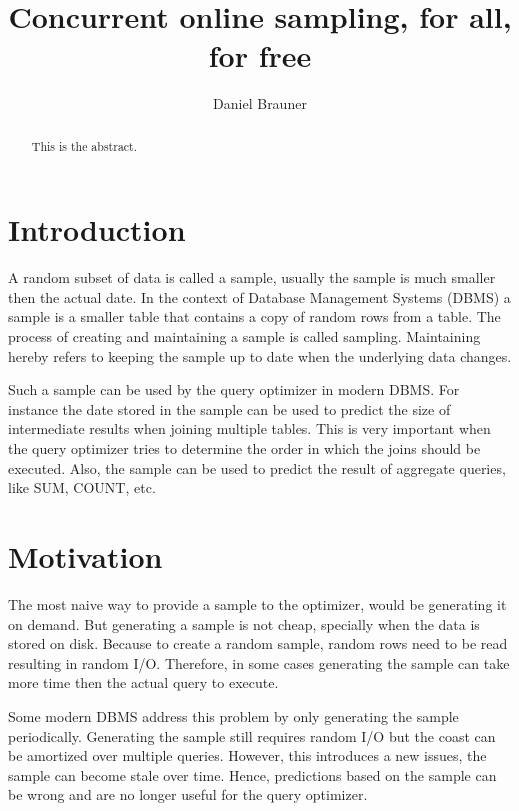 \documentclass[acmlarge,nonacm]{acmart}
\begin{document}
    \title{Concurrent online sampling, for all, for free}

    \author{Daniel Brauner}
    
    \begin{abstract}
        This is the abstract.
    \end{abstract}


    \maketitle

    \section{Introduction}
        A random subset of data is called a sample, usually the sample is much smaller then the actual date. In the context of Database Management Systems (DBMS) a sample is a smaller table that contains a copy of random rows from a table. The process of creating and maintaining a sample is called sampling. Maintaining hereby refers to keeping the sample up to date when the underlying data changes.
    
        Such a sample can be used by the query optimizer in modern DBMS. For instance the date stored in the sample can be used to predict the size of intermediate results when joining multiple tables. This is very important when the query optimizer tries to determine the order in which the joins should be executed. Also, the sample can be used to predict the result of aggregate queries, like SUM, COUNT, etc. 


    \section{Motivation} 
        The most naive way to provide a sample to the optimizer, would be generating it on demand. But generating a sample is not cheap, specially when the data is stored on disk. Because to create a random sample, random rows need to be read resulting in random I/O. Therefore, in some cases generating the sample can take more time then the actual query to execute.

        Some modern DBMS address this problem by only generating the sample periodically. Generating the sample still requires random I/O but the coast can be amortized over multiple queries. However, this introduces a new issues, the sample can become stale over time. Hence, predictions based on the sample can be wrong and are no longer useful for the query optimizer.
\end{document}
